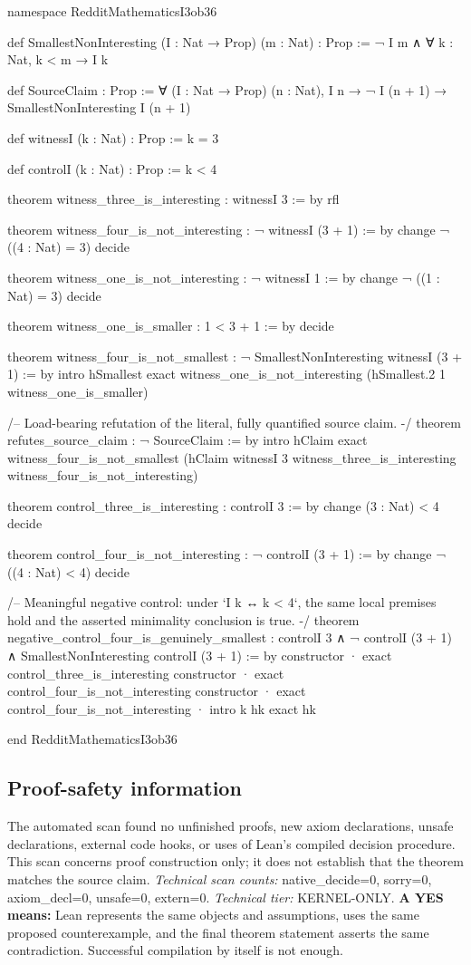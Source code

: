 \documentclass[11pt]{article}
\begin{document}
\begin{Vlean}
namespace RedditMathematicsI3ob36

def SmallestNonInteresting (I : Nat → Prop) (m : Nat) : Prop :=
  ¬ I m ∧ ∀ k : Nat, k < m → I k

def SourceClaim : Prop :=
  ∀ (I : Nat → Prop) (n : Nat),
    I n → ¬ I (n + 1) → SmallestNonInteresting I (n + 1)

def witnessI (k : Nat) : Prop :=
  k = 3

def controlI (k : Nat) : Prop :=
  k < 4

theorem witness_three_is_interesting : witnessI 3 := by
  rfl

theorem witness_four_is_not_interesting : ¬ witnessI (3 + 1) := by
  change ¬ ((4 : Nat) = 3)
  decide

theorem witness_one_is_not_interesting : ¬ witnessI 1 := by
  change ¬ ((1 : Nat) = 3)
  decide

theorem witness_one_is_smaller : 1 < 3 + 1 := by
  decide

theorem witness_four_is_not_smallest :
    ¬ SmallestNonInteresting witnessI (3 + 1) := by
  intro hSmallest
  exact witness_one_is_not_interesting
    (hSmallest.2 1 witness_one_is_smaller)

/-- Load-bearing refutation of the literal, fully quantified source claim. -/
theorem refutes_source_claim : ¬ SourceClaim := by
  intro hClaim
  exact witness_four_is_not_smallest
    (hClaim witnessI 3 witness_three_is_interesting
      witness_four_is_not_interesting)

theorem control_three_is_interesting : controlI 3 := by
  change (3 : Nat) < 4
  decide

theorem control_four_is_not_interesting : ¬ controlI (3 + 1) := by
  change ¬ ((4 : Nat) < 4)
  decide

/-- Meaningful negative control: under `I k ↔ k < 4`, the same local premises
hold and the asserted minimality conclusion is true. -/
theorem negative_control_four_is_genuinely_smallest :
    controlI 3 ∧
    ¬ controlI (3 + 1) ∧
    SmallestNonInteresting controlI (3 + 1) := by
  constructor
  · exact control_three_is_interesting
  constructor
  · exact control_four_is_not_interesting
  constructor
  · exact control_four_is_not_interesting
  · intro k hk
    exact hk

end RedditMathematicsI3ob36

\end{Vlean}
\subsection*{Proof-safety information}
The automated scan found no unfinished proofs, new axiom declarations, unsafe declarations, external code hooks, or uses of Lean's compiled decision procedure. This scan concerns proof construction only; it does not establish that the theorem matches the source claim.
\textit{Technical scan counts:} native\_decide=0, sorry=0, axiom\_decl=0, unsafe=0, extern=0. \textit{Technical tier:} KERNEL-ONLY.
\textbf{A YES means:} Lean represents the same objects and assumptions, uses the same proposed counterexample, and the final theorem statement asserts the same contradiction. Successful compilation by itself is not enough.
\clearpage
\end{document}
